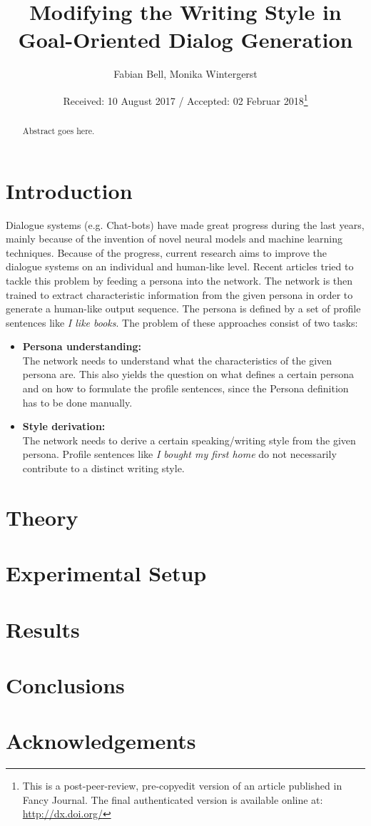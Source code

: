 \documentclass[twocolumn]{tum-article}
\title{Modifying the Writing Style in Goal-Oriented Dialog Generation}
\author{Fabian Bell\authormark{1,\Letter}\orcid{0000-0001-9595-4226},
  Monika Wintergerst\authormark{1}\orcid{0000-0002-9244-5431}}
\affil[1]{Department of Informatics, Technical University of Munich (TUM),
  Boltzmannstr. 3, 85748 Garching, Germany}
\date{Received: 10 August 2017 / Accepted: 02 Februar 2018\thanks{This is a
    post-peer-review, pre-copyedit version of an article published in Fancy
    Journal. The final authenticated version is available online at:
    \url{http://dx.doi.org/}}}
\begin{document}
\maketitle

\begin{abstract}
  Abstract goes here. \lipsum[1]
\end{abstract}

\section{Introduction}

Dialogue systems (e.g. Chat-bots) have made great progress during the last years, mainly because of the invention of novel neural models and machine learning techniques. Because of the progress, current research aims to improve the dialogue systems on an individual and human-like level. Recent articles \cite[]{DBLP:journals/corr/abs-1901-08149, liu2020impress} tried to tackle this problem by feeding a persona into the network. The network is then trained to extract characteristic information from the given persona in order to generate a human-like output sequence. The persona is defined by a set of profile sentences like \textit{I like books}. The problem of these approaches consist of two tasks:
\begin{itemize}
\item \textbf{Persona understanding:}\\
The network needs to understand what the characteristics of the given persona are. This also yields the question on what defines a certain persona and on how to formulate the profile sentences, since the Persona definition has to be done manually. 
\item \textbf{Style derivation:}\\
The network needs to derive a certain speaking/writing style from the given persona. Profile sentences like \textit{I bought my first home} \cite[]{liu2020impress} do not necessarily contribute to a distinct writing style.
\end{itemize}


\section{Theory}

\lipsum[3-4]

\section{Experimental Setup}

\lipsum[4-5]

\section{Results}

\lipsum[6]

\section{Conclusions}

\lipsum[7]

\section*{Acknowledgements}

\lipsum[8]



\end{document}
